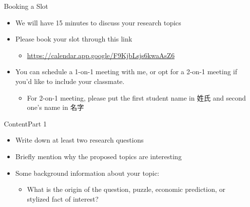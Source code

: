 \documentclass[dvipsnames,hyperref={pdfpagelabels=false}]{beamer}
\begin{document}
\begin{frame}{Booking a Slot}
	\begin{itemize} 
	
		\item We will have 15 minutes to discuss your research topics
		\vspace{0.2cm}
		\item Please book your slot through this link
		\vspace{0.2cm}
		\begin{itemize} 
			\item \url{https://calendar.app.google/F9KjbLsjs6kwaAsZ6}
			
		\end{itemize}
		\vspace{0.2cm}
		\item You can schedule a 1-on-1 meeting with me, or opt for a 2-on-1 meeting if you'd like to include your classmate. 
	\vspace{0.2cm}
	\begin{itemize} 
		\item For 2-on-1 meeting, please put the first student name in 姓氏 and second one's name in 名字
		
	\end{itemize}
		\vspace{0.2cm}
			
		
	\end{itemize}
\end{frame}







\begin{frame}{Content}{Part 1}
	\begin{itemize} 
		\item Write down at least two research questions
		\vspace{0.2cm}
		\item Briefly mention why the proposed topics are interesting 
		\vspace{0.2cm}
		\item Some background information about your topic: 
		\vspace{0.2cm}
		\begin{itemize}
			\item What is the origin of the question, puzzle, economic prediction, or stylized fact of interest?
		\end{itemize}
		
		
		
		
	\end{itemize}
\end{frame}
\end{document}
